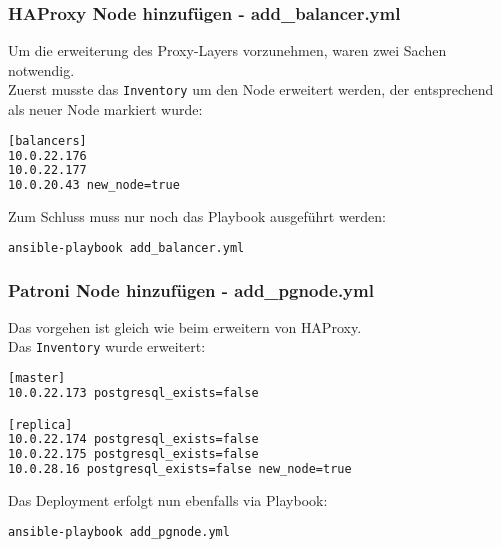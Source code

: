 \begin{flushleft}
    \subsubsection{\Gls{HAProxy} Node hinzufügen - add\_balancer.yml}
    Um die erweiterung des Proxy-Layers vorzunehmen, waren zwei Sachen notwendig.\\
    Zuerst musste das \texttt{Inventory} um den Node erweitert werden, der entsprechend als neuer Node markiert wurde:
    \lstset{style=gra_codestyle}
    \begin{lstlisting}[language=bash, caption=HAProxy Node erweitern - Inventory,captionpos=b,label={lst:add-balancer-inventory},breaklines=true]
[balancers]
10.0.22.176
10.0.22.177
10.0.20.43 new_node=true
    \end{lstlisting}
    Zum Schluss muss nur noch das Playbook ausgeführt werden:
    \lstset{style=gra_codestyle}
    \begin{lstlisting}[language=bash, caption=HAProxy Node erweitern - add\_balancer.yml,captionpos=b,label={lst:add-balancer},breaklines=true]
ansible-playbook add_balancer.yml
    \end{lstlisting}
    \subsubsection{Patroni Node hinzufügen - add\_pgnode.yml}
    Das vorgehen ist gleich wie beim erweitern von \Gls{HAProxy}.\\
    Das \texttt{Inventory} wurde erweitert:
    \lstset{style=gra_codestyle}
    \begin{lstlisting}[language=bash, caption=Patroni Node erweitern - Inventory,captionpos=b,label={lst:add-pgnode-inventory},breaklines=true]
[master]
10.0.22.173 postgresql_exists=false

[replica]
10.0.22.174 postgresql_exists=false
10.0.22.175 postgresql_exists=false
10.0.28.16 postgresql_exists=false new_node=true
    \end{lstlisting}
    Das Deployment erfolgt nun ebenfalls via Playbook:
    \lstset{style=gra_codestyle}
    \begin{lstlisting}[language=bash, caption=Patroni Node erweitern - add\_pgnode.yml,captionpos=b,label={lst:add-pgnode},breaklines=true]
ansible-playbook add_pgnode.yml
    \end{lstlisting}

\end{flushleft}